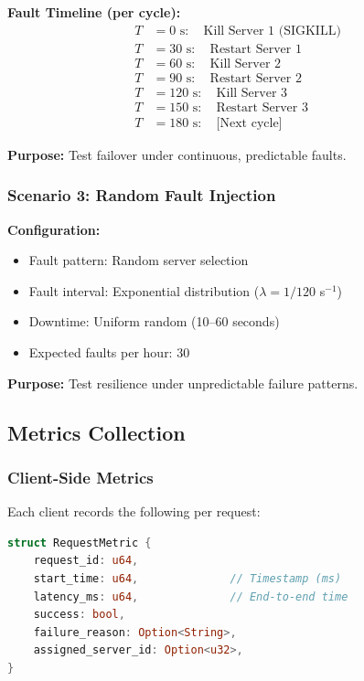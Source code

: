 \documentclass[12pt,a4paper]{article}
\begin{document}
\textbf{Fault Timeline (per cycle):}
\begin{align*}
T &= 0\text{ s}: \quad \text{Kill Server 1 (SIGKILL)} \\
T &= 30\text{ s}: \quad \text{Restart Server 1} \\
T &= 60\text{ s}: \quad \text{Kill Server 2} \\
T &= 90\text{ s}: \quad \text{Restart Server 2} \\
T &= 120\text{ s}: \quad \text{Kill Server 3} \\
T &= 150\text{ s}: \quad \text{Restart Server 3} \\
T &= 180\text{ s}: \quad \text{[Next cycle]}
\end{align*}

\textbf{Purpose:} Test failover under continuous, predictable faults.

\subsubsection{Scenario 3: Random Fault Injection}

\textbf{Configuration:}
\begin{itemize}
    \item Fault pattern: Random server selection
    \item Fault interval: Exponential distribution ($\lambda = 1/120$ s$^{-1}$)
    \item Downtime: Uniform random (10--60 seconds)
    \item Expected faults per hour: 30
\end{itemize}

\textbf{Purpose:} Test resilience under unpredictable failure patterns.

\subsection{Metrics Collection}

\subsubsection{Client-Side Metrics}

Each client records the following per request:

\begin{lstlisting}[language=Rust,caption={Client Metrics Structure},label=lst:client-metrics]
struct RequestMetric {
    request_id: u64,
    start_time: u64,              // Timestamp (ms)
    latency_ms: u64,              // End-to-end time
    success: bool,
    failure_reason: Option<String>,
    assigned_server_id: Option<u32>,
}
\end{lstlisting}
\end{document}
